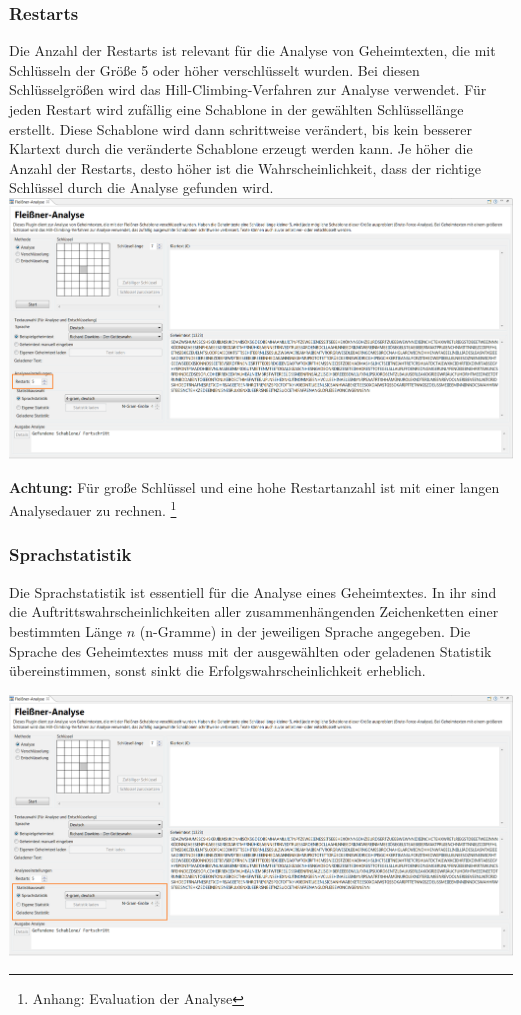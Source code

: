 \documentclass[fontsize=12pt, DIV=15, parskip=half-]{scrartcl}
\theoremstyle{break}
\begin{document}
\subsubsection{Restarts}
Die Anzahl der Restarts ist relevant für die Analyse von Geheimtexten, die mit Schlüsseln der Größe 5 oder höher verschlüsselt wurden. Bei diesen Schlüsselgrößen wird das \glqq Hill-Climbing\grqq -Verfahren zur Analyse verwendet. Für jeden Restart wird zufällig eine Schablone in der gewählten Schlüssellänge erstellt. Diese Schablone wird dann schrittweise verändert, bis kein besserer Klartext durch die veränderte Schablone erzeugt werden kann. Je höher die Anzahl der Restarts, desto höher ist die Wahrscheinlichkeit, dass der richtige Schlüssel durch die Analyse gefunden wird.
\includegraphics[scale=0.45]{FleissnerRestarts.png}

\textbf{Achtung:} Für große Schlüssel und eine hohe Restartanzahl ist mit einer langen Analysedauer zu rechnen. \footnote{Anhang: Evaluation der Analyse}

\subsubsection{Sprachstatistik}
Die Sprachstatistik ist essentiell für die Analyse eines Geheimtextes. In ihr sind die Auftrittswahrscheinlichkeiten aller zusammenhängenden Zeichenketten einer bestimmten Länge $n$ (n-Gramme) in der jeweiligen Sprache angegeben. Die Sprache des Geheimtextes muss mit der ausgewählten oder geladenen Statistik übereinstimmen, sonst sinkt die Erfolgswahrscheinlichkeit erheblich.

\includegraphics[scale=0.45]{FleissnerStatistics.png}
\end{document}
